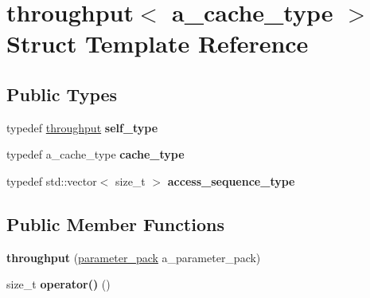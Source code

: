 \hypertarget{structthroughput}{}\section{throughput$<$ a\+\_\+cache\+\_\+type $>$ Struct Template Reference}
\label{structthroughput}
\subsection*{Public Types}
\begin{DoxyCompactItemize}
\item 
\hypertarget{structthroughput_a6314648b6ea65a5adfc7319ce2914a14}{}typedef \hyperlink{structthroughput}{throughput} {\bfseries self\+\_\+type}\label{structthroughput_a6314648b6ea65a5adfc7319ce2914a14}

\item 
\hypertarget{structthroughput_a5c1920a1c3b7f81d09d53e88c41f1670}{}typedef a\+\_\+cache\+\_\+type {\bfseries cache\+\_\+type}\label{structthroughput_a5c1920a1c3b7f81d09d53e88c41f1670}

\item 
\hypertarget{structthroughput_ac2b12cc9b9fb38910c976a310d6a19e5}{}typedef std\+::vector$<$ size\+\_\+t $>$ {\bfseries access\+\_\+sequence\+\_\+type}\label{structthroughput_ac2b12cc9b9fb38910c976a310d6a19e5}

\end{DoxyCompactItemize}
\subsection*{Public Member Functions}
\begin{DoxyCompactItemize}
\item 
\hypertarget{structthroughput_ac3b6f7e7759fcc93cb2b3caddc070017}{}{\bfseries throughput} (\hyperlink{structparameter__pack}{parameter\+\_\+pack} a\+\_\+parameter\+\_\+pack)\label{structthroughput_ac3b6f7e7759fcc93cb2b3caddc070017}

\item 
\hypertarget{structthroughput_afaca0a4241ff5d0beaf23f71e42b1233}{}size\+\_\+t {\bfseries operator()} ()\label{structthroughput_afaca0a4241ff5d0beaf23f71e42b1233}

\end{DoxyCompactItemize}
